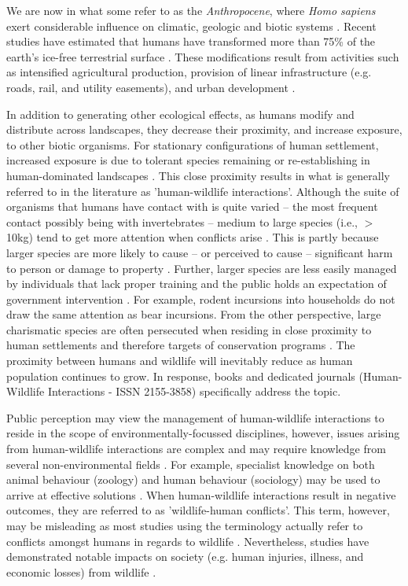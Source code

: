 We are now in what some refer to as the \textit{Anthropocene}, where \textit{Homo sapiens} exert considerable influence on climatic, geologic and biotic systems \citep{crut06}. Recent studies have estimated that humans have transformed more than 75\% of the earth's ice-free terrestrial surface \citep{elli08}. These modifications result from activities such as intensified agricultural production, provision of linear infrastructure (e.g. roads, rail, and utility easements), and urban development \citep{vito97,sand02,fole05}.

In addition to generating other ecological effects, as humans modify and distribute across landscapes, they decrease their proximity, and increase exposure, to other biotic organisms. For stationary configurations of human settlement, increased exposure is due to tolerant species remaining or re-establishing in human-dominated landscapes \citep{soul16}. This close proximity results in what is generally referred to in the literature as 'human-wildlife interactions'. Although the suite of organisms that humans have contact with is quite varied -- the most frequent contact possibly being with invertebrates -- medium to large species (i.e., $>$10kg) tend to get more attention when conflicts arise \citep{seor16}. This is partly because larger species are more likely to cause -- or perceived to cause -- significant harm to person or damage to property \citep{cono01}. Further, larger species are less easily managed by individuals that lack proper training and the public holds an expectation of government intervention \citep{reit99}. For example, rodent incursions into households do not draw the same attention as bear incursions. From the other perspective, large charismatic species are often persecuted when residing in close proximity to human settlements and therefore targets of conservation programs \citep{trev03}. The proximity between humans and wildlife will inevitably reduce as human population continues to grow. In response, books \citep{manf08} and dedicated journals (Human-Wildlife Interactions - ISSN 2155-3858) specifically address the topic.

Public perception may view the management of human-wildlife interactions to reside in the scope of environmentally-focussed disciplines, however, issues arising from human-wildlife interactions are complex and may require knowledge from several non-environmental fields \citep{deck97,madd04}. For example, specialist knowledge on both animal behaviour (zoology) and human behaviour (sociology) may be used to arrive at effective solutions \citep{dicka10}. When human-wildlife interactions result in negative outcomes, they are referred to as 'wildlife-human conflicts'. This term, however, may be misleading as most studies using the terminology actually refer to conflicts amongst humans in regards to wildlife \citep{pete10}. Nevertheless, studies have demonstrated notable impacts on society (e.g. human injuries, illness, and economic losses) from wildlife \citep{cono95}. 

